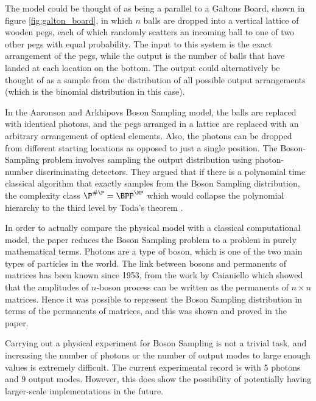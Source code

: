 \documentclass[11pt]{article}
\theoremstyle{theorem}
\theoremstyle{remark}
\theoremstyle{plain}
\theoremstyle{definition}
\begin{document}
The model could be thought of as being a parallel to a Galtons Board, shown in figure \ref{fig:galton_board}, in which $n$ balls are dropped into a vertical lattice of wooden pegs, each of which randomly scatters an incoming ball to one of two other pegs with equal probability. The input to this system is the exact arrangement of the pegs, while the output is the number of balls that have landed at each location on the bottom. The output could alternatively be thought of as a sample from the distribution of all possible output arrangements (which is the binomial distribution in this case).

In the Aaronson and Arkhipovs Boson Sampling model, the balls are replaced with identical photons, and the pegs arranged in a lattice are replaced with an arbitrary arrangement of optical elements. Also, the photons can be dropped from different starting locations as opposed to just a single position. The Boson-Sampling problem involves sampling the output distribution using photon-number discriminating detectors. They argued that if there is a polynomial time classical algorithm that exactly samples from the Boson Sampling distribution, the complexity class $\P^{\#\P} = \BPP^{\NP} $  which would collapse the polynomial hierarchy to the third level by Toda's theorem \cite{toda1991}.

In order to actually compare the physical model with a classical computational model, the paper reduces the Boson Sampling problem to a problem in purely mathematical terms. Photons are a type of boson, which is one of the two main types of particles in the world. The link between bosons and permanents of matrices has been known since 1953, from the work by Caianiello \cite{Caianiello1953} which showed that the amplitudes of $n$-boson process can be written as the permanents of $n \times n$ matrices. Hence it was possible to represent the Boson Sampling distribution in terms of the permanents of matrices, and this was shown and proved in the paper.

Carrying out a physical experiment for Boson Sampling is not a trivial task, and increasing the number of photons or the number of output modes to large enough values is extremely difficult. The current experimental record is with 5 photons and 9 output modes. However, this does show the possibility of potentially having larger-scale implementations in the future.
\end{document}
